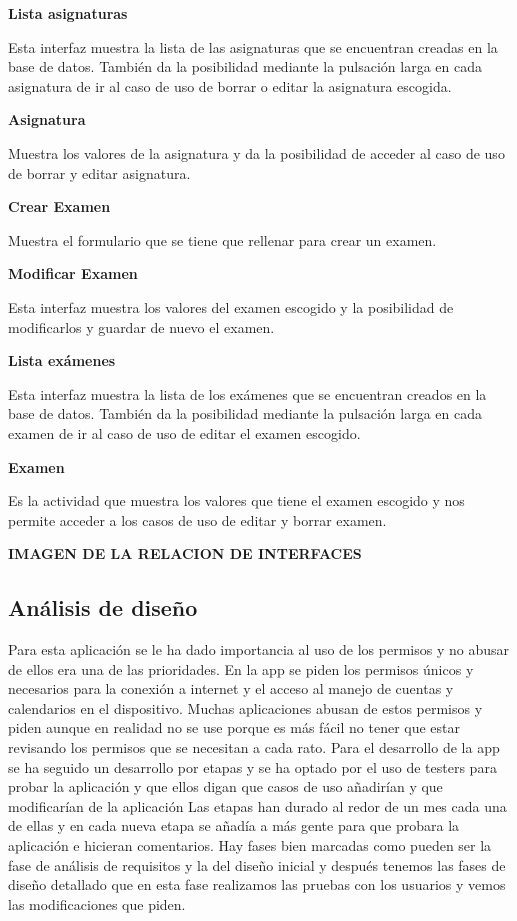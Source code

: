 \textbf{Lista asignaturas}

Esta interfaz muestra la lista de las asignaturas que se encuentran creadas en la base de datos.
También da la posibilidad mediante la pulsación larga en cada asignatura de ir al caso de uso de borrar o editar la asignatura escogida.

\textbf{Asignatura}

Muestra los valores de la asignatura y da la posibilidad de acceder al caso de uso de borrar y editar asignatura.

\textbf{Crear Examen}

Muestra el formulario que se tiene que rellenar para crear un examen.

\textbf{Modificar Examen}

Esta interfaz muestra los valores del examen escogido y la posibilidad de modificarlos y guardar de nuevo el examen.

\textbf{Lista exámenes}

Esta interfaz muestra la lista de los exámenes que se encuentran creados en la base de datos.
También da la posibilidad mediante la pulsación larga en cada examen de ir al caso de uso de editar el examen escogido.

\textbf{Examen}

Es la actividad que muestra los valores que tiene el examen escogido y nos permite acceder a los casos de uso de editar y borrar examen.

\textbf{IMAGEN DE LA RELACION DE INTERFACES}

\subsection{Análisis de diseño}
\label{subsecc:Análisis de diseño}

Para esta aplicación se le ha dado importancia al uso de los permisos y no abusar de ellos era una de las prioridades.
En la app se piden los permisos únicos y necesarios para la conexión a internet y el acceso al manejo de cuentas y calendarios en el dispositivo.
Muchas aplicaciones abusan de estos permisos y piden aunque en realidad no se use porque es más fácil no tener que estar revisando los permisos que se necesitan a cada rato.
Para el desarrollo de la app se ha seguido un desarrollo por etapas y se ha optado por el uso de testers para probar la aplicación y que ellos digan que casos de uso añadirían y que modificarían de la aplicación
Las etapas han durado al redor de un mes cada una de ellas y en cada nueva etapa se añadía a más gente para que probara la aplicación e hicieran comentarios.
Hay fases bien marcadas como pueden ser la fase de análisis de requisitos y la del diseño inicial y después tenemos las fases de diseño detallado que en esta fase realizamos las pruebas con los usuarios y vemos las modificaciones que piden.






















